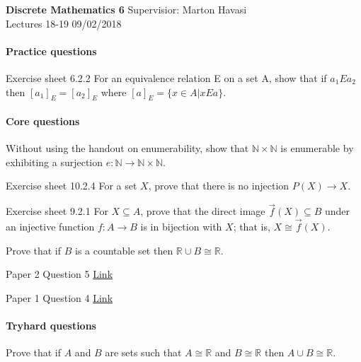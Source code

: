 \documentclass{exam}
\begin{document}
\noindent
\large\textbf{Discrete Mathematics 6} \hfill Supervisior: Marton Havasi \\
\normalsize Lectures 18-19 \hfill 09/02/2018

\paragraph{Practice questions}
\begin{questions}

\question Exercise sheet 6.2.2 For an equivalence relation E on a set A, show that if $a_1 E a_2$ then $[a_1]_E = [a_2]_E$  where $[a]_E = \{ x \in A | x E a \}$.
\end{questions}

\paragraph{Core questions}
\begin{questions}

\question Without using the handout on enumerability, show that $\mathbb{N}\times \mathbb{N}$ is enumerable by exhibiting a surjection $e: \mathbb{N} \rightarrow \mathbb{N}\times \mathbb{N}$.

\question Exercise sheet 10.2.4 For a set $X$, prove that there is no injection $P(X) \rightarrow X$.

\question Exercise sheet 9.2.1 For $X \subseteq A$, prove that the direct image $\overrightarrow{f} (X) \subseteq B$ under an injective function $f : A \rightarrow B$ is in bijection
with $X$; that is, $X \cong \overrightarrow{f} (X)$.

\question Prove that if $B$ is a countable set then $\mathbb{R} \cup B \cong \mathbb{R}$.

 Paper 2 Question 5 \href{http://www.cl.cam.ac.uk/teaching/exams/pastpapers/y2006p2q5.pdf}{Link}

 Paper 1 Question 4 \href{https://www.cl.cam.ac.uk/teaching/exams/pastpapers/y2009p1q4.pdf}{Link} 
\end{questions}

\paragraph{Tryhard questions}
\begin{questions}

\question Prove that if $A$ and $B$ are sets such that $A \cong \mathbb{R}$ and
$B \cong \mathbb{R}$ then $A \cup B \cong \mathbb{R}$.



\end{questions}
\end{document}

